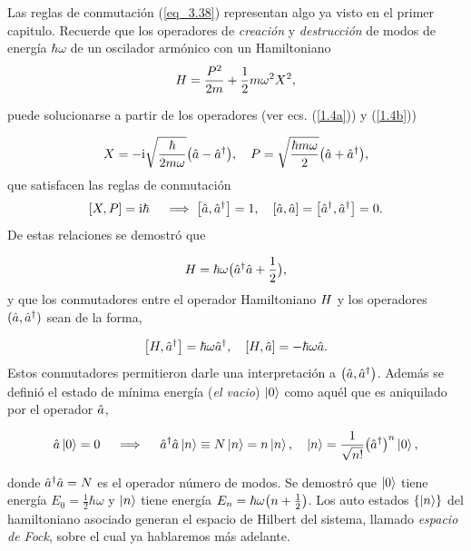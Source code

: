 \begin{prof}
	
Las reglas de conmutación (\ref{eq_3.38}) representan algo ya visto en el primer capitulo. Recuerde que los operadores de \emph{creación} y \emph{destrucción} de modos de energía $\hbar \omega$ de un oscilador armónico con un Hamiltoniano
\begin{equation}
    H = \frac{P^2}{2m}+\frac{1}{2} m \omega^2 X^2,
\end{equation}

puede solucionarse a partir de los operadores (ver ecs. (\ref{1.4a})) y (\ref{1.4b}))

\begin{equation}
    X =-\mathrm{i} \sqrt{\frac{\hbar}{2m\omega}} \qty(\hat{a}-\hat{a}^\dag), \quad P = \sqrt{\frac{\hbar m \omega}{2}}\qty(\hat{a}+\hat{a}^\dag), 
\end{equation}
que satisfacen las reglas de conmutación 
\begin{equation}
    \comm{X}{P} = \ii \hbar \quad \implies \comm{\Oa}{\Oa^\dag} = 1,\quad \comm{\Oa}{\Oa}=\comm{\Oa^\dag}{\Oa^\dag}=0.
\end{equation}
De estas relaciones se demostró que

\begin{equation}
    H = \hbar \omega \qty\big(\hat{a}^\dag \hat{a}+ \frac{1}{2}),
\end{equation}
y que los conmutadores entre el operador Hamiltoniano $H$ y los operadores $(\hat{a},\hat{a}^\dag)$ sean de la forma,

\begin{equation}
    \comm{\OH}{\Oa^\dag}=\hbar \omega \Oa^\dag, \quad \comm{\OH}{\Oa}=-\hbar \omega \Oa.
    \label{eq_3.43}
\end{equation}
Estos conmutadores permitieron darle una interpretación a $\qty(\hat{a},\hat{a}^\dag)$. Además se definió el estado de mínima energía (\emph{el vacio}) $\ket{0}$ como aquél que es aniquilado por el operador $\hat{a}$, 

\begin{equation}
    \hat{a} \ket{0} = 0 \quad \implies \quad \hat{a}^\dag \hat{a} \ket{n} \equiv N \ket{n} = n \ket{n}, \quad \ket{n}=\frac{1}{\sqrt{n!}}\qty(\hat{a}^\dag)^n\ket{0},
\end{equation}

donde $\hat{a}^\dag \hat{a}=N$ es el operador número de modos. Se demostró que $\ket{0}$ tiene energía $E_0=\frac{1}{2}\hbar \omega$ y $\ket{n}$ tiene energía $E_{n}=\hbar \omega \qty(n+\frac{1}{2})$. Los auto estados $\qty{\ket{n}}$ del hamiltoniano asociado generan el espacio de Hilbert del sistema, llamado \emph{espacio de Fock}, sobre el cual ya hablaremos más adelante.\\

\end{prof}

